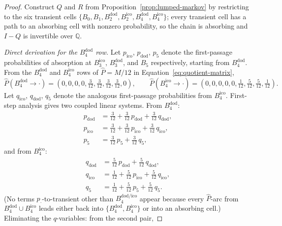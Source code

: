 \documentclass[11pt, a4paper]{amsart}
\theoremstyle{definition}
\newcommand{\Q}{\mathbb{Q}}
\begin{document}
\begin{proof}
Construct $Q$ and $R$ from
Proposition~\ref{prop:lumped-markov} by restricting to the six
transient cells $\{B_0, B_1, B_2^{\mathrm{dod}},
B_2^{\mathrm{ico}}, B_4^{\mathrm{dod}}, B_4^{\mathrm{ico}}\}$;
every transient cell has a path to an absorbing cell with nonzero
probability, so the chain is absorbing and $I - Q$ is invertible
over $\Q$.

\emph{Direct derivation for the $B_4^{\mathrm{dod}}$ row.} Let
$p_{\text{ico}}$, $p_{\text{dod}}$, $p_5$ denote the first-passage
probabilities of absorption at $B_3^{\mathrm{ico}}$,
$B_3^{\mathrm{dod}}$, and $B_5$ respectively, starting from
$B_4^{\mathrm{dod}}$. From the $B_4^{\mathrm{dod}}$ and
$B_4^{\mathrm{ico}}$ rows of $\widehat P = M / 12$ in
Equation~\eqref{eq:quotient-matrix},
\[
\widehat P(B_4^{\mathrm{dod}} \to \cdot) =
\left(0, 0, 0, 0, \tfrac{3}{12}, \tfrac{3}{12},
\tfrac{3}{12}, \tfrac{3}{12}, 0\right),
\qquad
\widehat P(B_4^{\mathrm{ico}} \to \cdot) =
\left(0, 0, 0, 0, 0, \tfrac{1}{12}, \tfrac{5}{12},
\tfrac{5}{12}, \tfrac{1}{12}\right).
\]
Let $q_{\text{ico}}$, $q_{\text{dod}}$, $q_5$ denote the
analogous first-passage probabilities from $B_4^{\mathrm{ico}}$.
First-step analysis gives two coupled linear systems. From
$B_4^{\mathrm{dod}}$:
\begin{align*}
p_{\text{dod}}  &= \tfrac{3}{12} + \tfrac{3}{12}\,p_{\text{dod}}
                 + \tfrac{3}{12}\,q_{\text{dod}}, \\
p_{\text{ico}}  &= \tfrac{3}{12} + \tfrac{3}{12}\,p_{\text{ico}}
                 + \tfrac{3}{12}\,q_{\text{ico}}, \\
p_5             &= \tfrac{3}{12}\,p_5 + \tfrac{3}{12}\,q_5,
\end{align*}
and from $B_4^{\mathrm{ico}}$:
\begin{align*}
q_{\text{dod}}  &= \tfrac{5}{12}\,p_{\text{dod}}
                 + \tfrac{5}{12}\,q_{\text{dod}}, \\
q_{\text{ico}}  &= \tfrac{1}{12} + \tfrac{5}{12}\,p_{\text{ico}}
                 + \tfrac{5}{12}\,q_{\text{ico}}, \\
q_5             &= \tfrac{1}{12} + \tfrac{5}{12}\,p_5
                 + \tfrac{5}{12}\,q_5.
\end{align*}
(No terms $p_{\cdot}$-to-transient other than $B_4^{\text{dod/ico}}$
appear because every $\widehat P$-arc from $B_4^{\mathrm{dod}} \cup
B_4^{\mathrm{ico}}$ leads either back into $\{B_4^{\mathrm{dod}},
B_4^{\mathrm{ico}}\}$ or into an absorbing cell.) Eliminating the
$q$-variables: from the second pair,

\end{proof}
\end{document}
